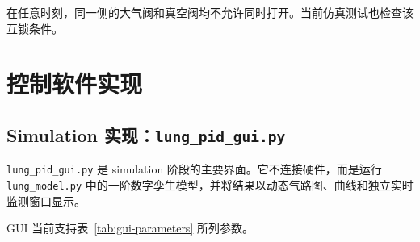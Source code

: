 \documentclass[UTF8,11pt,a4paper]{ctexart}
\begin{document}
在任意时刻，同一侧的大气阀和真空阀均不允许同时打开。当前仿真测试也检查该互锁条件。

\section{控制软件实现}

\subsection{Simulation 实现：\texttt{lung\_pid\_gui.py}}

\texttt{lung\_pid\_gui.py} 是 simulation 阶段的主要界面。它不连接硬件，而是运行 \texttt{lung\_model.py} 中的一阶数字孪生模型，并将结果以动态气路图、曲线和独立实时监测窗口显示。

GUI 当前支持表~\ref{tab:gui-parameters} 所列参数。
\end{document}
